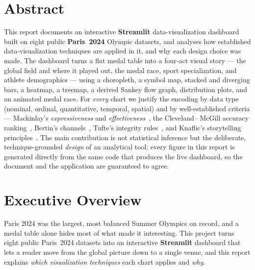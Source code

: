 \documentclass[11pt]{article}
\begin{document}
\thispagestyle{fancy}
\section*{Abstract}
This report documents an interactive \textbf{Streamlit} data-visualization
dashboard built on eight public \textbf{Paris~2024} Olympic datasets, and analyses
how established data-visualization techniques are applied in it, and why each
design choice was made. The dashboard turns a flat medal table into a four-act visual story ---
the global field and where it played out, the medal race, sport specialization,
and athlete demographics --- using a choropleth, a symbol map, stacked and
diverging bars, a heatmap, a treemap, a derived Sankey flow graph, distribution
plots, and an animated medal race. For \emph{every} chart we justify the encoding
by data type (nominal, ordinal, quantitative, temporal, spatial) and by
well-established criteria --- Mackinlay's \emph{expressiveness} and
\emph{effectiveness}~\cite{mackinlay1986}, the Cleveland\,--\,McGill accuracy
ranking~\cite{cleveland1984}, Bertin's channels~\cite{bertin1983}, Tufte's
integrity rules~\cite{tufte2001}, and Knaflic's storytelling
principles~\cite{knaflic2015}. The main contribution is not statistical inference
but the deliberate, technique-grounded \emph{design} of an analytical tool: every
figure in this report is generated directly from the same code that produces the
live dashboard, so the document and the application are guaranteed to agree.

\clearpage

\tableofcontents
\thispagestyle{fancy}
\clearpage

\section{Executive Overview}
\label{sec:exec}

Paris 2024 was the largest, most balanced Summer Olympics on record, and a
medal table alone hides most of what made it interesting. This project turns
eight public Paris~2024 datasets into an interactive \textbf{Streamlit}
dashboard that lets a reader move from the global picture down to a single
venue, and this report explains \emph{which visualization techniques} each chart
applies and \emph{why}.
\end{document}

